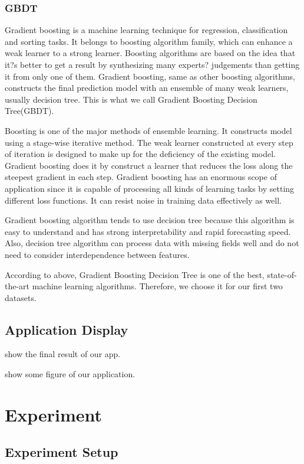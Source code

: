 \documentclass[letterpaper]{article} %
\begin{document}
\subsubsection{GBDT}

Gradient boosting is a machine learning technique for regression, classification and sorting tasks. It belongs to boosting algorithm family, which can enhance a weak learner to a strong learner. Boosting algorithms are based on the idea that it?s better to get a result by synthesizing many experts? judgements than getting it from only one of them. Gradient boosting, same as other boosting algorithms, constructs the final prediction model with an ensemble of many weak learners, usually decision tree. This is what we call Gradient Boosting Decision Tree(GBDT).

Boosting is one of the major methods of ensemble learning. It constructs model using a stage-wise iterative method. The weak learner constructed at every step of iteration is designed to make up for the deficiency of the existing model. Gradient boosting does it by construct a learner that reduces the loss along the steepest gradient in each step. Gradient boosting has an enormous scope of application since it is capable of processing all kinds of learning tasks by setting different loss functions. It can resist noise in training data effectively as well.

Gradient boosting algorithm tends to use decision tree because this algorithm is easy to understand and has strong interpretability and rapid forecasting speed. Also, decision tree algorithm can process data with missing fields well and do not need to consider interdependence between features.

According to above, Gradient Boosting Decision Tree is one of the best, state-of-the-art machine learning algorithms. Therefore, we choose it for our first two datasets.

\subsection{Application Display}

show the final result of our app.

show some figure of our application.

\section{Experiment}

\subsection{Experiment Setup}
\end{document}
